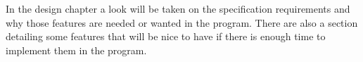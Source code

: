 In the design chapter a look will be taken on the specification requirements and why those features are needed or wanted in the program. There are also a section detailing some features that will be nice to have if there is enough time to implement them in the program.